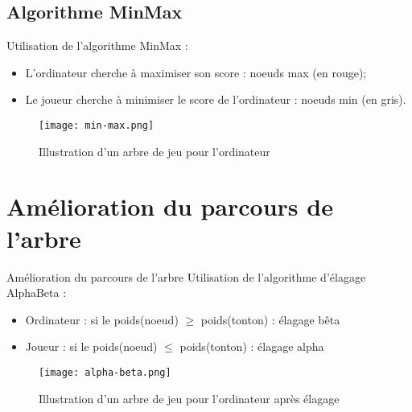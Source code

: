 \documentclass{beamer}
\begin{document}
\subsection{Algorithme MinMax}
\begin{frame}
    Utilisation de l'algorithme MinMax :
    \begin{itemize}
        \item L'ordinateur cherche à maximiser son score : noeuds max (en rouge);
        \item Le joueur cherche à minimiser le score de l'ordinateur : noeuds min (en gris).
    \end{itemize}
    \begin{figure}
    \centering
    \texttt{[image: min-max.png]}
    \caption{Illustration d’un arbre de jeu pour l’ordinateur}
    \label{fig:min-max}
    \end{figure}
\end{frame}

\section{Amélioration du parcours de l'arbre}
\begin{frame}{Amélioration du parcours de l'arbre}
    Utilisation de l'algorithme d’élagage AlphaBeta :
    \begin{itemize}
        \item Ordinateur : si le poids(noeud) $\geq$ poids(tonton) : élagage bêta
        \item Joueur : si le poids(noeud) $\leq$ poids(tonton) : élagage alpha
    \end{itemize}
    \begin{figure}
    \centering
    \texttt{[image: alpha-beta.png]}
    \caption{Illustration d’un arbre de jeu pour l’ordinateur après élagage}
    \label{fig:alpha-beta}
    \end{figure}
\end{frame}
\end{document}

